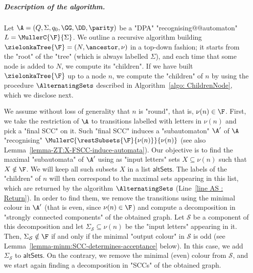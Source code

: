 \documentclass[10pt,a4paper]{amsart}
\renewcommand{\S}{\mathcal{S}}
\renewcommand{\SS}{\Sigma}
\begin{document}
\subparagraph*{Description of the algorithm.}
Let $\A=(Q,\SS,q_0,\GG,\DD,\parity)$  be a "DPA"  "recognising@@automaton" $L = \MullerC{\F}{\SS}$. We outline a recursive algorithm  building $\zielonkaTree{\F} = (N, \ancestor, \nu)$ in a top-down fashion; it starts from the "root" of the "tree" (which is always labelled $\SS$), and each time that some node is added to $N$, we compute its "children".
If we have built $\zielonkaTree{\F}$ up to a node $n$, we compute the "children" of $n$ by using the procedure $\AlternatingSets$ described in Algorithm~\ref{algo: ChildrenNode}, which we disclose next. 

We assume without loss of generality that $n$ is "round", that is, $\nu(n)\in \F$. First, we take the restriction of $\A$ to transitions labelled with letters in $\nu(n)$ and pick a "final SCC" on it. Such "final SCC" induces a "subautomaton" $\A'$ of $\A$ "recognising" $\MullerC{\restSubsets{\F}{\nu(n)}}{\nu(n)}$ (see also Lemma~\ref{lemma-ZT:X-FSCC-induce-automata}).
Our objective is to find the maximal "subautomata" of $\A'$ using as "input letters" sets $X\subseteq \nu(n)$ such that $X\notin \F$. We will keep all such subsets $X$ in a list $\mathsf{altSets}$. The labels of the "children" of $n$ will then correspond to the maximal sets appearing  in this list, which are returned by the algorithm $\AlternatingSets$ (Line~\ref{line AS : Return}).
In order to find them, we remove the transitions using the minimal colour in $\A'$ (that is even, since $\nu(n)\in \F$) and compute a decomposition in "strongly connected components" of the obtained graph.
Let $\S$ be a component of this decomposition and let $\SS_\S\subseteq \nu(n)$ be the "input letters" appearing in it. Then, $\SS_\S\notin \F$ if and only if  the minimal "output colour" in $\S$ is odd (see Lemma~\ref{lemma-minm:SCC-determines-acceptance} below). In this case, we add $\SS_\S$ to $\mathsf{altSets}$. On the contrary, we remove the minimal (even) colour from $\S$, and we start again finding a decomposition in "SCCs" of the obtained graph.
\end{document}
